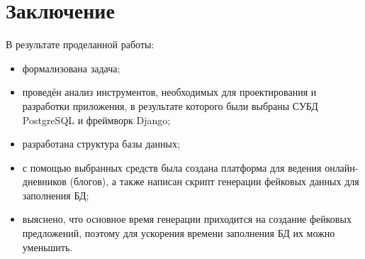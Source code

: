 \chapter*{Заключение}

В результате проделанной работы:
\begin{itemize}
	\item формализована задача;
	\item проведён анализ инструментов, необходимых для проектирования и разработки приложения, в результате которого были выбраны СУБД PostgreSQL и фреймворк Django;
	\item разработана структура базы данных;
	\item с помощью выбранных средств была создана платформа для ведения онлайн-дневников (блогов), а также написан скрипт генерации фейковых данных для заполнения БД;
	\item выяснено, что основное время генерации приходится на создание фейковых предложений, поэтому для ускорения времени заполнения БД их можно уменьшить.
\end{itemize}
